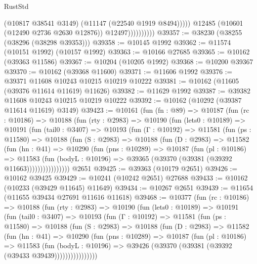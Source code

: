 \begin{lexlean}{RustStd}
\begin{coremodule}
                              (@10817 @38541 @3149)
                              (@11147 (@22540 @1919 @8494)))))
                        @12485
                        (@10601 (@12490 @2736 @2630 @12876))
                        @12497))))))))))
@39357 := @38230 (@38255 (@38296 (@38298 @39353)))
@39358 := @10145 @1992
@39362 := @11574 (@10151 @1992) (@10157 @1992)
@39363 := @10166 @27685
@39365 := @10162 (@39363 @11586)
@39367 := @10204 (@10205 @1992)
@39368 := @10200 @39367
@39370 := @10162 (@39368 @11600)
@39371 := @11606 @1992
@39376 := @39371 @11608 @10243 @10215 @10219 @10222
@39381 := @10162 (@11605 (@39376 @11614 @11619) @11626)
@39382 := @11629 @1992
@39387 := @39382 @11608 @10243 @10215 @10219 @10222
@39392 := @10162 (@10292 (@39387 @11614 @11619) @3149)
@39423 := @10161
    (fun (fn : @89) =>
    @10187
      (fun (rc : @10186) =>
      @10188
        (fun (rty : @2983) =>
        @10190
          (fun (lets0 : @10189) =>
          @10191
            (fun (tail0 : @3407) =>
            @10193
              (fun (Γ : @10192) =>
              @11581
                (fun (ps : @11580) =>
                @10188
                  (fun (S : @2983) =>
                  @10188
                    (fun (D : @2983) =>
                    @11582
                      (fun (hn : @41) =>
                      @10290
                        (fun (pns : @10289) =>
                        @10187
                          (fun (pl : @10186) =>
                          @11583
                            (fun (bodyL : @10196) =>
                            @39365 (@39370 (@39381 (@39392 @11663))))))))))))))))
    @2651
@39425 := @39363 (@10179 @2651)
@39426 := @10162 @39425
@39429 := @10241 (@10242 @2651) @27688
@39433 := @10162 (@10233 (@39429 @11645) @11649)
@39434 := @10267 @2651
@39439 := @11654 (@11655 @39434 @27691 @11616 @11618)
@39468 := @10377
    (fun (rc : @10186) =>
    @10188
      (fun (rty : @2983) =>
      @10190
        (fun (lets0 : @10189) =>
        @10191
          (fun (tail0 : @3407) =>
          @10193
            (fun (Γ : @10192) =>
            @11581
              (fun (ps : @11580) =>
              @10188
                (fun (S : @2983) =>
                @10188
                  (fun (D : @2983) =>
                  @11582
                    (fun (hn : @41) =>
                    @10290
                      (fun (pns : @10289) =>
                      @10187
                        (fun (pl : @10186) =>
                        @11583
                          (fun (bodyL : @10196) =>
                          @39426 (@39370 (@39381 (@39392 (@39433 @39439))))))))))))))))

\end{coremodule}
\end{lexlean}

